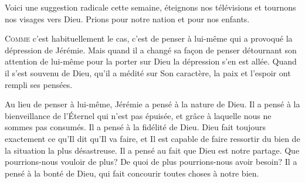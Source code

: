 Voici une suggestion radicale\frcolon{} cette semaine, éteignons nos télévisions
 et tournons nos visages vers Dieu.
 Prions pour notre nation et pour nos enfants. 

\dvrule








\lettrine{C}{omme} c'est habituellement le cas, c'est de penser à lui-même
 qui a provoqué la dépression de Jérémie.
 Mais quand il a changé sa fa\c{c}on de penser
 \ocadr détournant son attention de lui-même pour la porter sur Dieu \fcadr{}
 la dépression s'en est allée. Quand il s'est souvenu de Dieu,
 qu'il a médité sur Son caractère, la paix et l'espoir ont rempli ses pensées. 


Au lieu de penser à lui-même, Jérémie a pensé à la nature de Dieu.
 Il a pensé à la bienveillance de l'Éternel qui n'est pas épuisée,
 et grâce à laquelle nous ne sommes pas consumés.
 Il a pensé à la fidélité de Dieu. Dieu fait toujours exactement
 ce qu'Il dit qu'Il va faire, et Il est capable de faire ressortir du bien
 de la situation la plus désastreuse. Il a pensé au fait que Dieu
 est notre partage. Que pourrions-nous vouloir de plus?
 De quoi de plus pourrions-nous avoir besoin?
 Il a pensé à la bonté de Dieu,
 qui fait concourir toutes choses à notre bien. 


